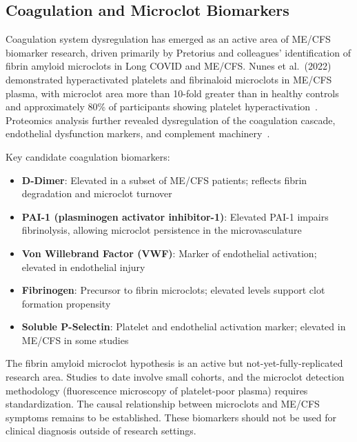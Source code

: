 \subsection{Coagulation and Microclot Biomarkers}
\label{subsec:coagulation-biomarkers}

Coagulation system dysregulation has emerged as an active area of ME/CFS biomarker research, driven primarily by Pretorius and colleagues' identification of fibrin amyloid microclots in Long COVID and ME/CFS. Nunes et al.\ (2022) demonstrated hyperactivated platelets and fibrinaloid microclots in ME/CFS plasma, with microclot area more than 10-fold greater than in healthy controls and approximately 80\% of participants showing platelet hyperactivation~\cite{Nunes2022microclots}. Proteomics analysis further revealed dysregulation of the coagulation cascade, endothelial dysfunction markers, and complement machinery~\cite{Nunes2024coagulation}.

Key candidate coagulation biomarkers:
\begin{itemize}
    \item \textbf{D-Dimer}: Elevated in a subset of ME/CFS patients; reflects fibrin degradation and microclot turnover
    \item \textbf{PAI-1 (plasminogen activator inhibitor-1)}: Elevated PAI-1 impairs fibrinolysis, allowing microclot persistence in the microvasculature
    \item \textbf{Von Willebrand Factor (VWF)}: Marker of endothelial activation; elevated in endothelial injury
    \item \textbf{Fibrinogen}: Precursor to fibrin microclots; elevated levels support clot formation propensity
    \item \textbf{Soluble P-Selectin}: Platelet and endothelial activation marker; elevated in ME/CFS in some studies
\end{itemize}

\begin{limitation}
The fibrin amyloid microclot hypothesis is an active but not-yet-fully-replicated research area. Studies to date involve small cohorts, and the microclot detection methodology (fluorescence microscopy of platelet-poor plasma) requires standardization. The causal relationship between microclots and ME/CFS symptoms remains to be established. These biomarkers should not be used for clinical diagnosis outside of research settings.
\end{limitation}

